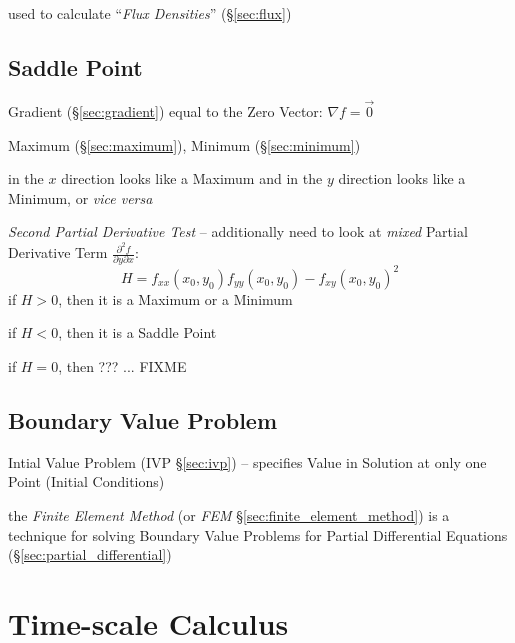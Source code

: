 used to calculate ``\emph{Flux Densities}'' (\S\ref{sec:flux}) %



\subsection{Saddle Point}\label{sec:saddle_point}

Gradient (\S\ref{sec:gradient}) equal to the Zero Vector: $\nabla{f} = \vec{0}$

Maximum (\S\ref{sec:maximum}), Minimum (\S\ref{sec:minimum})

in the $x$ direction looks like a Maximum and in the $y$ direction looks like a
Minimum, or \emph{vice versa}

\emph{Second Partial Derivative Test} -- additionally need to look at
\emph{mixed} Partial Derivative Term
$\frac{\partial^2{f}}{\partial{y}\partial{x}}$:
\[
  H = f_{xx}(x_0,y_0)f_{yy}(x_0,y_0) - f_{xy}(x_0,y_0)^2
\]
if $H > 0$, then it is a Maximum or a Minimum

if $H < 0$, then it is a Saddle Point

if $H = 0$, then ??? ... FIXME



\subsection{Boundary Value Problem}\label{sec:boundary_value_problem}


\fist Intial Value Problem (IVP \S\ref{sec:ivp}) -- specifies Value in Solution
at only one Point (Initial Conditions)


\fist the \emph{Finite Element Method} (or \emph{FEM}
\S\ref{sec:finite_element_method}) is a technique for solving Boundary Value
Problems for Partial Differential Equations (\S\ref{sec:partial_differential})



\section{Time-scale Calculus}\label{sec:timescale_calculus}

